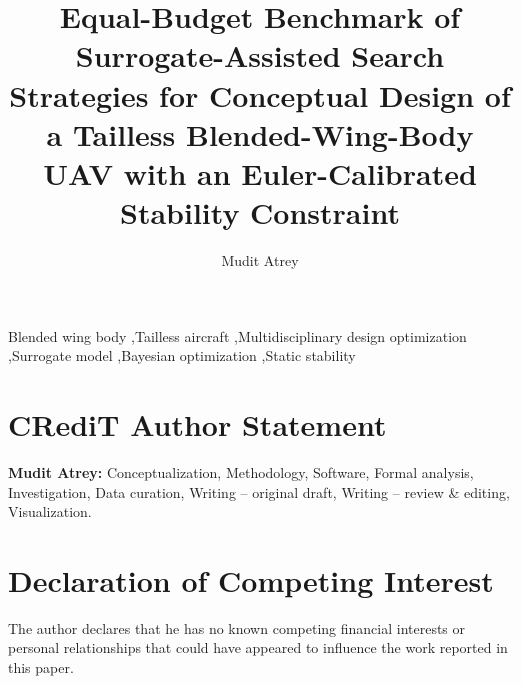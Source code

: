 \documentclass[3p,times]{elsarticle}
\begin{document}
\begin{frontmatter}

\title{Equal-Budget Benchmark of Surrogate-Assisted Search Strategies for Conceptual Design of a Tailless Blended-Wing-Body UAV with an Euler-Calibrated Stability Constraint}

\author[kit]{Mudit Atrey}


\begin{abstract}

\end{abstract}

\begin{keyword}
Blended wing body \sep Tailless aircraft \sep Multidisciplinary design optimization \sep Surrogate model \sep Bayesian optimization \sep Static stability
\end{keyword}

\end{frontmatter}










\section*{CRediT Author Statement}
\textbf{Mudit Atrey:} Conceptualization, Methodology, Software, Formal analysis, Investigation, Data curation, Writing -- original draft, Writing -- review \& editing, Visualization.

\section*{Declaration of Competing Interest}
The author declares that he has no known competing financial interests or personal relationships that could have appeared to influence the work reported in this paper.
\end{document}
